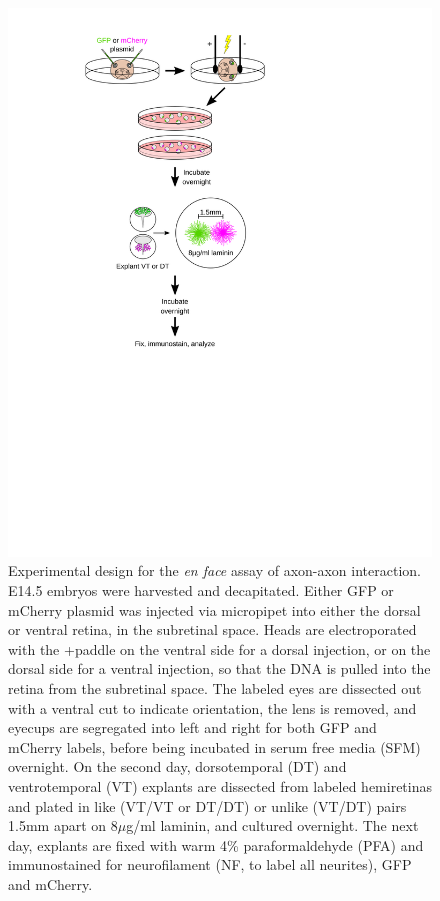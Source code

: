 \begin{figure}[hbtp]
    \begin{center}
        \includegraphics{Figures/EnFaceAssayDesign.svg}
        \caption[Experimental design for the \emph{en face} assay of axon-axon interaction.]
        {Experimental design for the \emph{en face} assay of axon-axon interaction.
		E14.5 embryos were harvested and decapitated.
		Either GFP or mCherry plasmid was injected via micropipet into either the dorsal or ventral retina, in the subretinal space.
		Heads are electroporated with the +paddle on the ventral side for a dorsal injection, or on the dorsal side for a ventral injection, so that the DNA is pulled into the retina from the subretinal space.
		The labeled eyes are dissected out with a ventral cut to indicate orientation, the lens is removed, and eyecups are segregated into left and right for both GFP and mCherry labels, before being incubated in serum free media (SFM) overnight.
		On the second day, dorsotemporal (DT) and ventrotemporal (VT) explants are dissected from labeled hemiretinas and plated in like (VT/VT or DT/DT) or unlike (VT/DT) pairs 1.5mm apart on 8$\mu$g/ml laminin, and cultured overnight.
		The next day, explants are fixed with warm 4\% paraformaldehyde (PFA) and immunostained for neurofilament (NF, to label all neurites), GFP and mCherry.
		}
        \label{Figures/EnFaceAssayDesign}
    \end{center}
\end{figure}
